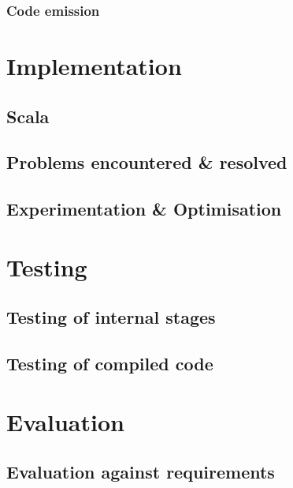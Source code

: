 \documentclass[11pt]{report}
\begin{document}
\subsection{Code emission}

\chapter{Implementation}
\section{Scala}
\section{Problems encountered \& resolved}
\section{Experimentation \& Optimisation}

\chapter{Testing}
\section{Testing of internal stages}
\section{Testing of compiled code}


\chapter{Evaluation}

\section{Evaluation against requirements}
\end{document}

